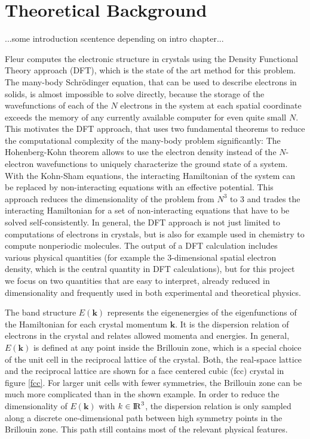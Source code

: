 
\chapter{Theoretical Background}
\label{chap:theory}

...some introduction scentence depending on intro chapter...


Fleur computes the electronic structure in crystals using the Density Functional Theory approach (DFT), which is the state of the art method for this problem. The many-body Schrödinger equation, that can be used to describe electrons in solids, is almost impossible to solve directly, because the storage of the wavefunctions of each of the $N$ electrons in the system at each spatial coordinate exceeds the memory of any currently available computer for even quite small $N$. This motivates the DFT approach, that uses two fundamental theorems to reduce the computational complexity of the many-body problem significantly: The Hohenberg-Kohn theorem allows to use the electron density instead of the $N$-electron wavefunctions to uniquely characterize the ground state of a system. With the Kohn-Sham equations, the interacting Hamiltonian of the system can be replaced by non-interacting equations with an effective potential. This approach reduces the dimensionality of the problem from $N^3$ to $3$ and trades the interacting Hamiltonian for a set of non-interacting equations that have to be solved self-consistently. In general, the DFT approach is not just limited to computations of electrons in crystals, but is also for example used in chemistry to compute nonperiodic molecules.
% 
The output of a DFT calculation includes various physical quantities (for example the 3-dimensional spatial electron density, which is the central quantity in DFT calculations), but for this project we focus on two quantities that are easy to interpret, already reduced in dimensionality and frequently used in both experimental and theoretical physics.

The band structure $E(\mathbf{k})$ represents the eigenenergies of the eigenfunctions of the Hamiltonian for each crystal momentum $\mathbf{k}$. It is the dispersion relation of electrons in the crystal and relates allowed momenta and energies. In general, $E(\mathbf{k})$ is defined at any point inside the Brillouin zone, which is a special choice of the unit cell in the reciprocal lattice of the crystal. Both, the real-space lattice and the reciprocal lattice are shown for a face centered cubic (fcc) crystal in figure \ref{fcc}. For larger unit cells with fewer symmetries, the Brillouin zone can be much more complicated than in the shown example. In order to reduce the dimensionality of $E(\mathbf{k})$ with $k \in {\rm I\!R}^3$, the dispersion relation is only sampled along a discrete one-dimensional path between high symmetry points in the Brillouin zone. This path still contains most of the relevant physical features.


